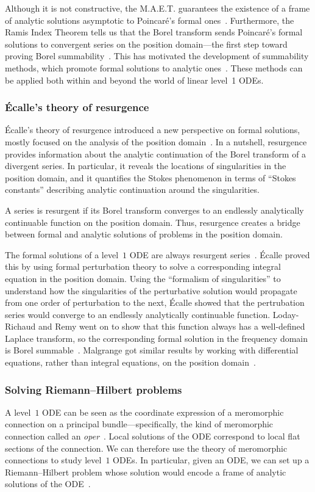 \documentclass{article}
\theoremstyle{definition}
\theoremstyle{plain}
\begin{document}
Although it is not constructive, the M.A.E.T. guarantees the existence of a frame of analytic solutions asymptotic to Poincar\'{e}'s formal ones~\cite[Chapter~14]{balser}. Furthermore, the Ramis Index Theorem tells us that the Borel transform sends Poincar\'{e}'s formal solutions to convergent series on the position domain---the first step toward proving Borel summability~\cite{ramis_index}. This has motivated the development of summability methods, which promote formal solutions to analytic ones~\cite{diverg-resurg--ii,malgrange--fourier,malgrange1995sommation,malgrange92,ramis1991series}. These methods can be applied both within and beyond the world of linear level~1 ODEs.
%
\subsubsection{\'{E}calle's theory of resurgence}
%
\'{E}calle's theory of resurgence introduced a new perspective on formal solutions, mostly focused on the analysis of the position domain~\cite{EcalleIII,loday-Remy2011}. In a nutshell, resurgence provides information about the analytic continuation of the Borel transform of a divergent series. In particular, it reveals the locations of singularities in the position domain, and it quantifies the Stokes phenomenon in terms of ``Stokes constants'' describing analytic continuation around the singularities.

A series is resurgent if its Borel transform converges to an endlessly analytically continuable function on the position domain. Thus, resurgence creates a bridge between formal and analytic solutions of problems in the position domain.

The formal solutions of a level~$1$ ODE are always resurgent series~\cite[Proposition~2.2.1]{EcalleIII}. \'{E}calle proved this by using formal perturbation theory to solve a corresponding integral equation in the position domain. Using the ``formalism of singularities'' to understand how the singularities of the perturbative solution would propagate from one order of perturbation to the next, \'{E}calle showed that the pertrubation series would converge to an endlessly analytically continuable function. Loday-Richaud and Remy went on to show that this function always has a well-defined Laplace transform, so the corresponding formal solution in the frequency domain is Borel summable~\cite{loday-Remy2011}. Malgrange got similar results by working with differential equations, rather than integral equations, on the position domain~\cite{malgrange--fourier}.
%
\subsubsection{Solving Riemann--Hilbert problems}
%
A level~$1$ ODE can be seen as the coordinate expression of a meromorphic connection on a principal bundle---specifically, the kind of meromorphic connection called an {\em oper}~\cite{BD-opers}. Local solutions of the ODE correspond to local flat sections of the connection. We can therefore use the theory of meromorphic connections to study level~$1$ ODEs. In particular, given an ODE, we can set up a Riemann--Hilbert problem whose solution would encode a frame of analytic solutions of the ODE~\cite[Section~3.2]{Dubrovin-Heun}.
\end{document}

